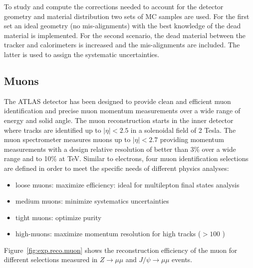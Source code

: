 To study and compute the corrections needed to account for the detector geometry and material distribution
two sets of MC samples are used. For the first set an ideal geometry (no mis-alignments) with the best
knowledge of the dead material is implemented. For the second scenario, the dead material between the
tracker and calorimeters is increased and the mis-alignments are included. The latter is used to assign the
systematic uncertainties.








\subsection{Muons}

The ATLAS detector has been designed to provide clean and efficient 
muon identification and precise muon momentum measurements over 
a wide range of energy and solid angle. 
The muon  reconstruction starts in the inner 
detector where tracks are identified up to $|\eta|<2.5$ in a solenoidal field of 2 Tesla.
The muon spectrometer  measures  muons up to $|\eta|<2.7$  
providing momentum measurements with a design relative resolution of better than 3\% over a wide 
\pt range and to 10\% at TeV.
Similar to electrons, four muon identification selections are defined in order to meet 
the specific needs of different physics analyses:
\begin{itemize}
\item loose muons: maximize efficiency: ideal for multilepton final states analysis
\item medium muons: minimize systematics uncertainties
\item tight muons: optimize  purity
\item high-\pt muons: maximize momentum resolution for high \pt tracks ($>100$ \GeV)  
\end{itemize}
Figure~\ref{fig:exp.reco.muon} shows the reconstruction efficiency of the muon for different selections measured in  $Z\to\mu\mu$ and $J/\psi\to\mu\mu$ events.

